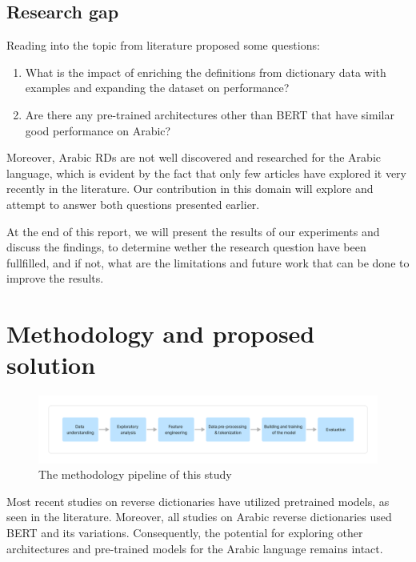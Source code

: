 \documentclass[12pt]{article}
\begin{document}
\subsection{Research gap}

Reading into the topic from literature proposed some questions:
\begin{enumerate}
    \item What is the impact of enriching the definitions from dictionary data with examples and expanding the dataset on performance?
    \item Are there any pre-trained architectures other than BERT that have similar good performance on Arabic?
\end{enumerate}

Moreover, Arabic RDs are not well discovered and researched for the Arabic language, which is evident by the fact that only few articles have explored it very recently in the literature. Our contribution in this domain will explore and attempt to answer both questions presented earlier.

At the end of this report, we will present the results of our experiments and discuss the findings, to determine wether the research question have been fullfilled, and if not, what are the limitations and future work that can be done to improve the results.

\newpage

\section{Methodology and proposed solution}

\begin{figure}
    \centering
    \captionsetup{justification=centering}
    \includegraphics[width=\textwidth]{methodology.png}
    \caption{The methodology pipeline of this study}
    \label{fig:methodology}
\end{figure}

Most recent studies on reverse dictionaries have utilized pretrained models, as seen in the literature. Moreover, all studies on Arabic reverse dictionaries used BERT and its variations. Consequently, the potential for exploring other architectures and pre-trained models for the Arabic language remains intact. 
\end{document}
